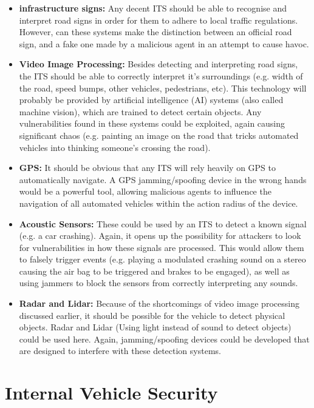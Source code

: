 \begin{itemize}
	\item \textbf{infrastructure signs:} Any decent ITS should be able to recognise and interpret road signs in order for them to adhere to local traffic regulations. However, can these systems make the distinction between an official road sign, and a fake one made by a malicious agent in an attempt to cause havoc. 
	
	\item \textbf{Video Image Processing:} Besides detecting and interpreting road signs, the ITS should be able to correctly interpret it's surroundings (e.g. width of the road, speed bumps, other vehicles, pedestrians, etc). This technology will probably be provided by artificial intelligence (AI) systems (also called machine vision), which are trained to detect certain objects. Any vulnerabilities found in these systems could be exploited, again causing significant chaos (e.g. painting an image on the road that tricks automated vehicles into thinking someone's crossing the road).
	
	\item \textbf{GPS:} It should be obvious that any ITS will rely heavily on GPS to automatically navigate. A GPS jamming/spoofing device in the wrong hands would be a powerful tool, allowing malicious agents to influence the navigation of all automated vehicles within the action radius of the device.
	
	\item \textbf{Acoustic Sensors:} These could be used by an ITS to detect a known signal (e.g. a car crashing). Again, it opens up the possibility for attackers to look for vulnerabilities in how these signals are processed. This would allow them to falsely trigger events (e.g. playing a modulated crashing sound on a stereo causing the air bag to be triggered and brakes to be engaged), as well as using jammers to block the sensors from correctly interpreting any sounds.
	
	\item \textbf{Radar and Lidar:} Because of the shortcomings of video image processing discussed earlier, it should be possible for the vehicle to detect physical objects. Radar and Lidar (Using light instead of sound to detect objects) could be used here. Again, jamming/spoofing devices could be developed that are designed to interfere with these detection systems.
\end{itemize}

\section{Internal Vehicle Security}
\label{sec:internal_vehicle_security}

